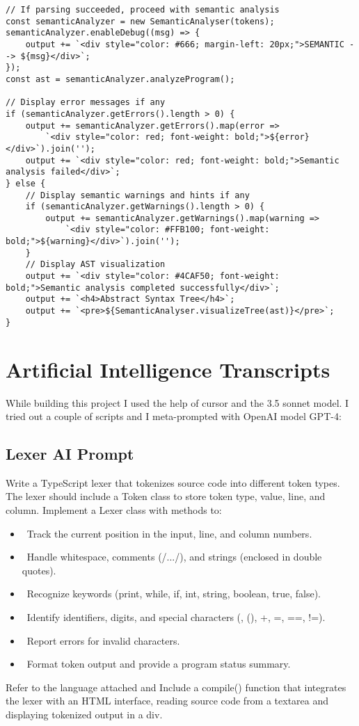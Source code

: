 \documentclass[12pt]{article}
\begin{document}
\begin{lstlisting}
// If parsing succeeded, proceed with semantic analysis
const semanticAnalyzer = new SemanticAnalyser(tokens);
semanticAnalyzer.enableDebug((msg) => {
    output += `<div style="color: #666; margin-left: 20px;">SEMANTIC --> ${msg}</div>`;
});
const ast = semanticAnalyzer.analyzeProgram();

// Display error messages if any
if (semanticAnalyzer.getErrors().length > 0) {
    output += semanticAnalyzer.getErrors().map(error => 
        `<div style="color: red; font-weight: bold;">${error}</div>`).join('');
    output += `<div style="color: red; font-weight: bold;">Semantic analysis failed</div>`;
} else {
    // Display semantic warnings and hints if any
    if (semanticAnalyzer.getWarnings().length > 0) {
        output += semanticAnalyzer.getWarnings().map(warning => 
            `<div style="color: #FFB100; font-weight: bold;">${warning}</div>`).join('');
    }
    // Display AST visualization
    output += `<div style="color: #4CAF50; font-weight: bold;">Semantic analysis completed successfully</div>`;
    output += `<h4>Abstract Syntax Tree</h4>`;
    output += `<pre>${SemanticAnalyser.visualizeTree(ast)}</pre>`;
}
\end{lstlisting}

\section{Artificial Intelligence Transcripts}
While building this project I used the help of cursor and the 3.5 sonnet model. I tried out a couple of scripts and I meta-prompted with OpenAI model GPT-4: 
\subsection{Lexer AI Prompt}
Write a TypeScript lexer that tokenizes source code into different token types. The lexer should include a Token class to store token type, value, line, and column. Implement a Lexer class with methods to: 
\begin{itemize}
    \item \ Track the current position in the input, line, and column numbers.
    \item \ Handle whitespace, comments (/.../), and strings (enclosed in double quotes).
    \item \ Recognize keywords (print, while, if, int, string, boolean, true, false).
    \item \ Identify identifiers, digits, and special characters ({}, (), +, =, ==, !=).
    \item \ Report errors for invalid characters.
    \item \ Format token output and provide a program status summary.
\end{itemize}
Refer to the language attached and Include a compile() function that integrates the lexer with an HTML interface, reading source code from a textarea and displaying tokenized output in a div.
\end{document}
